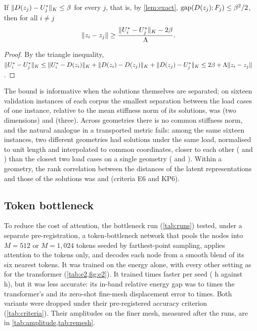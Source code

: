 \begin{proposition}\label{prop:sep}
If $\lVert D(z_j)-U^{\ast}_j\rVert_K\le\beta$ for every $j$, that is, by \cref{lem:exact},
$\operatorname{gap}(D(z_j);F_j)\le\beta^2/2$, then for all $i\neq j$
\begin{equation}
\lVert z_i-z_j\rVert \ge \frac{\lVert U^{\ast}_i-U^{\ast}_j\rVert_K-2\beta}{\Lambda}.
\label{eq:sep}
\end{equation}
\end{proposition}

\begin{proof}
By the triangle inequality,
$\lVert U^{\ast}_i-U^{\ast}_j\rVert_K\le\lVert U^{\ast}_i-D(z_i)\rVert_K+\lVert D(z_i)-D(z_j)\rVert_K
+\lVert D(z_j)-U^{\ast}_j\rVert_K\le2\beta+\Lambda\lVert z_i-z_j\rVert$.
\end{proof}

The bound is informative when the solutions themselves are separated; on sixteen
validation instances of each corpus the smallest separation between the load cases of one
instance, relative to the mean stiffness norm of its solutions, was \numPremiseTwo{} (two
dimensions) and \numPremiseThree{} (three). Across geometries there is no common stiffness
norm, and the natural analogue in a transported metric fails: among the same sixteen
instances, two different geometries had solutions under the same load, normalised to unit
length and interpolated to common coordinates, closer to each other (\numCrossTwo{} and
\numCrossThree{}) than the closest two load cases on a single geometry (\numWithinTwo{} and
\numWithinThree{}). Within a geometry, the rank correlation between the distances of the
latent representations and those of the solutions was \numRhoTwo{} and \numRhoThree{}
(criteria E6 and KP6).



\subsection{Token bottleneck}\label{app:e1:bottleneck}

To reduce the cost of attention, the bottleneck run (\cref{tab:runs}) tested, under a
separate pre-registration, a token-bottleneck network that pools the nodes into $M=512$ or
$M=1{,}024$ tokens seeded by farthest-point sampling, applies attention to the tokens only,
and decodes each node from a smooth blend of its six nearest tokens. It was trained on the
energy alone, with every other setting as for the transformer (\cref{tab:e2,fig:e2}). It
trained \numTimeBottleneckSpeedup{} times faster per seed (\numTimeBottleneckSeedMin{} h
against \numTimeThreeSeed{} h), but it was less accurate: its in-band relative energy gap
was \numEtwoGapMin{} to \numEtwoGapMax{} times the transformer's and its zero-shot
fine-mesh displacement error \numEtwoFineMin{} to \numEtwoFineMax{} times. Both variants
were dropped under their pre-registered accuracy criterion (\cref{tab:criteria}). Their
amplitudes on the finer mesh, measured after the runs, are in
\cref{tab:amplitude,tab:remesh}.

